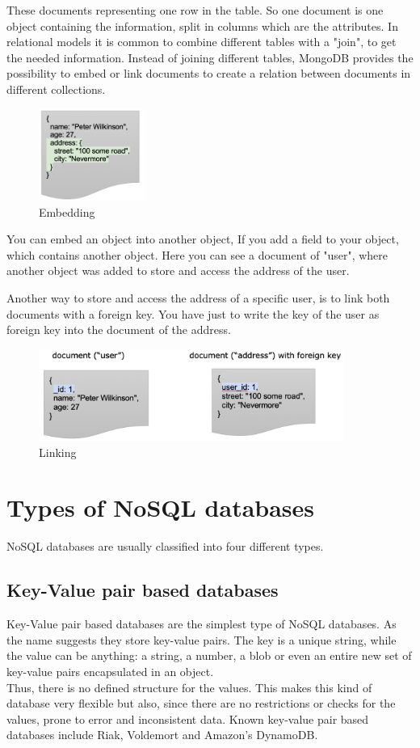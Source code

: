 \documentclass[11pt]{article}
\begin{document}
These documents representing one row in the table. So one document is one object containing the information, split in columns which are the attributes. In relational models it is common to combine different tables with a "join", to get the needed information.
Instead of joining different tables, MongoDB provides the possibility to embed or link documents to create a relation between documents in different collections.    

	\begin{figure}[H]
		\centering 
		\includegraphics[height=3cm]{figures/embedded-address}     
		\caption{Embedding}           
	\end{figure}    

You can embed an object into another object,
If you add a field to your object, 
which contains another object.
Here you can see a document of "user",
where another object was added
to store and access the address of the user. 

Another way to store and access the address of a specific user, is to link both documents with a foreign key. You have just to write the key of the user as foreign key into the document of the address.


	\begin{figure}[H]
		\centering  
		\includegraphics[height=3cm]{figures/linking}     
		\caption{Linking}           
	\end{figure}     

 
\section{Types of NoSQL databases} 
NoSQL databases are usually classified into four different types. 

\subsection{Key-Value pair based databases}
Key-Value pair based databases are the simplest type of NoSQL databases.
As the name suggests they store key-value pairs. 
The key is a unique string, while the value can be anything: a string, a number, a blob or even an entire new set of key-value pairs encapsulated in an object. 
\\Thus, there is no defined structure for the values. This makes this kind of database very flexible but also, since there are no restrictions or checks for the values, prone to error and inconsistent data. 
Known key-value pair based databases include Riak, Voldemort and Amazon's DynamoDB.
\end{document}
